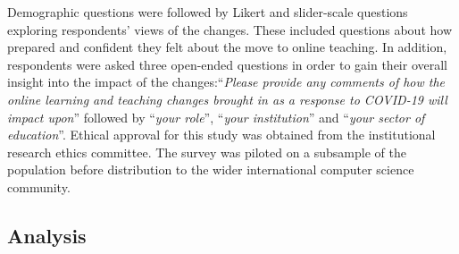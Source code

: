 \documentclass[conference]{IEEEtran}
\begin{document}

Demographic questions were followed by Likert and slider-scale
questions exploring respondents' views of the changes. These included
questions about how prepared and confident they felt about the move to
online teaching. In addition, respondents were asked three open-ended
questions in order to gain their overall insight into the impact of
the changes:``{\emph{Please provide any comments of how the online
learning and teaching changes brought in as a response to COVID-19
will impact upon}}'' followed by ``{\emph{your role}}'', ``{\emph{your
institution}}'' and ``{\emph{your sector of education}}''. Ethical
approval for this study was obtained from the institutional research
ethics committee. The survey was piloted on a subsample of the
population before distribution to the wider international computer science
community.


\subsection{Analysis}

\end{document}
